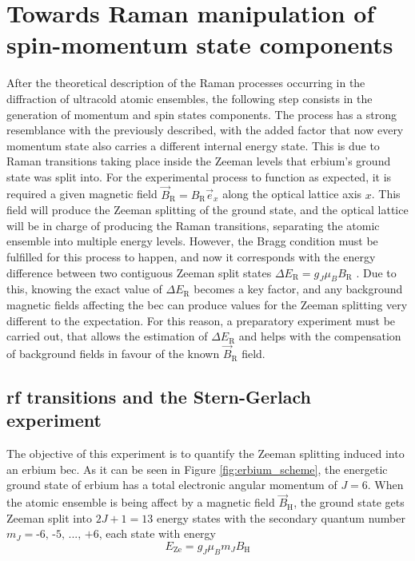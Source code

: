 
\chapter{Towards Raman manipulation of spin-momentum state components}
\label{chap:raman_manipulation}

After the theoretical description of the Raman processes occurring in the diffraction of ultracold atomic ensembles, the following step consists in the generation of momentum and spin states components. The process has a strong resemblance with the previously described, with the added factor that now every momentum state also carries a different internal energy state. This is due to Raman transitions taking place inside the Zeeman levels that erbium's ground state was split into. For the experimental process to function as expected, it is required a given magnetic field $\vec{B}_\text{R} = B_{\text{R}} \vec{e}_x$ along the optical lattice axis $x$. This field will produce the Zeeman splitting of the ground state, and the optical lattice will be in charge of producing the Raman transitions, separating the atomic ensemble into multiple energy levels. However, the Bragg condition must be fulfilled for this process to happen, and now it corresponds with the energy difference between two contiguous Zeeman split states $\Delta E_\text{R} = g_J \mu_B B_\text{R}$ \cite{Foot2005}. Due to this, knowing the exact value of $\Delta E_\text{R}$ becomes a key factor, and any background magnetic fields  affecting the \ac{bec} can produce values for the Zeeman splitting very different to the expectation. For this reason, a preparatory experiment must be carried out, that allows the estimation of $\Delta E_\text{R}$ and helps with the compensation of background fields in favour of the known $\vec{B}_\text{R}$ field.

\section{\Acl{rf} transitions and the Stern-Gerlach experiment}

The objective of this experiment is to quantify the Zeeman splitting induced into an erbium \ac{bec}. As it can be seen in Figure \ref{fig:erbium_scheme}, the energetic ground state of erbium has a total electronic angular momentum of $J = 6$. When the atomic ensemble is being affect by a magnetic field $\vec{B}_\text{H}$, the ground state gets Zeeman split into $2J+1 = 13$ energy states with the secondary quantum number $m_J = \text{-6, -5, ..., +6}$, each state with energy \cite{Foot2005}
\begin{equation}
	E_\text{Ze} = g_J \mu_B m_J B_\text{H}
\end{equation}

